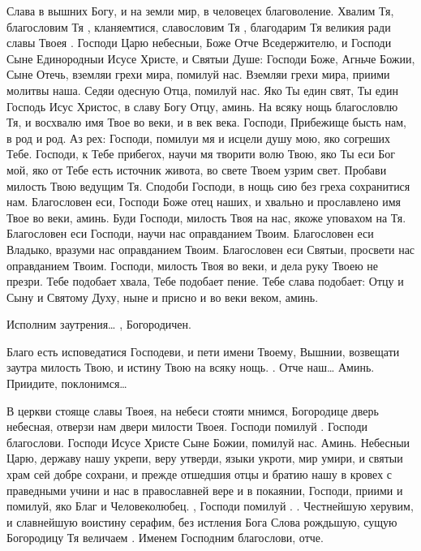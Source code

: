 \begin{mymulticols}
Слава в вышних Богу, и на земли мир, в человецех благоволение. Хвалим Тя, благословим Тя , кланяемтися, славословим Тя , благодарим Тя великия ради славы Твоея . Господи Царю небесныи, Боже Отче Вседержителю, и Господи Сыне Единородныи Исусе Христе, и Святыи Душе: Господи Боже, Агньче Божии, Сыне Отечь, вземляи грехи мира, помилуй нас. Вземляи грехи мира, приими молитвы наша. Седяи одесную Отца, помилуй нас. Яко Ты един свят, Ты един Господь Исус Христос, в славу Богу Отцу, аминь. На всяку нощь благословлю Тя, и восхвалю имя Твое во веки, и в век века. Господи, Прибежище бысть нам, в род и род. Аз рех: Господи, помилуи мя и исцели душу мою, яко согреших Тебе. Господи, к Тебе прибегох, научи мя творити волю Твою, яко Ты еси Бог мой, яко от Тебе есть источник живота, во свете Твоем узрим свет. Пробави милость Твою ведущим Тя. Сподоби Господи, в нощь сию без греха сохранитися нам. Благословен еси, Господи Боже отец наших, и хвально и прославлено имя Твое во веки, аминь. Буди Господи, милость Твоя на нас, якоже уповахом на Тя. Благословен еси Господи, научи нас оправданием Твоим. Благословен еси Владыко, вразуми нас оправданием Твоим. Благословен еси Святыи, просвети нас оправданием Твоим. Господи, милость Твоя во веки, и дела руку Твоею не презри. Тебе подобает хвала, Тебе подобает пение. Тебе слава подобает: Отцу и Сыну и Святому Духу, ныне и присно и во веки веком, аминь.


 Исполним заутрения…  , Богородичен.


 Благо есть исповедатися Господеви, и пети имени Твоему, Вышнии, возвещати заутра милость Твою, и истину Твою на всяку нощь.  .  Отче наш…  Аминь. Приидите, поклонимся… 


 В церкви стояще славы Твоея, на небеси стояти мнимся, Богородице дверь небесная, отверзи нам двери милости Твоея. Господи помилуй . Господи благослови. Господи Исусе Христе Сыне Божии, помилуй нас.  Аминь. Небесныи Царю, державу нашу укрепи, веру утверди, языки укроти, мир умири, и святыи храм сей добре сохрани, и прежде отшедшия отцы и братию нашу в кровех с праведными учини и нас в православней вере и в покаянии, Господи, приими и помилуй, яко Благ и Человеколюбец. , Господи помилуй . . Честнейшую херувим, и славнейшую воистину серафим, без истления Бога Слова рождьшую, сущую Богородицу Тя величаем . Именем Господним благослови, отче.





\end{mymulticols}

